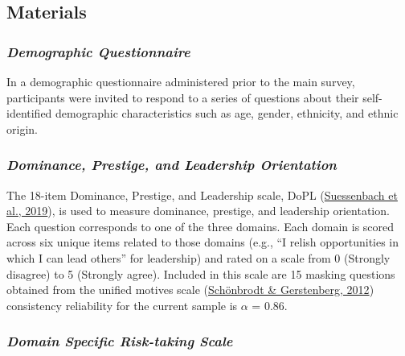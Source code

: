 \documentclass[
  donotrepeattitle,doc, 12pt, a4paper,floatsintext]{apa7}
\begin{document}
\hypertarget{materials}{%
\subsection{Materials}\label{materials}}

\newpage

\hypertarget{demographic-questionnaire}{%
\subsubsection{\texorpdfstring{\emph{Demographic Questionnaire}}{Demographic Questionnaire}}\label{demographic-questionnaire}}

In a demographic questionnaire administered prior to the main survey, participants were invited to respond to a series of questions about their self-identified demographic characteristics such as age, gender, ethnicity, and ethnic origin.

\hypertarget{dominance-prestige-and-leadership-orientation-1}{%
\subsubsection{\texorpdfstring{\emph{Dominance, Prestige, and Leadership Orientation}}{Dominance, Prestige, and Leadership Orientation}}\label{dominance-prestige-and-leadership-orientation-1}}

The 18-item Dominance, Prestige, and Leadership scale, DoPL (\protect\hyperlink{ref-suessenbach2019}{Suessenbach et al., 2019}), is used to measure dominance, prestige, and leadership orientation. Each question corresponds to one of the three domains. Each domain is scored across six unique items related to those domains (e.g., ``I relish opportunities in which I can lead others'' for leadership) and rated on a scale from 0 (Strongly disagree) to 5 (Strongly agree). Included in this scale are 15 masking questions obtained from the unified motives scale (\protect\hyperlink{ref-schonbrodt2012}{Schönbrodt \& Gerstenberg, 2012}) consistency reliability for the current sample is \(\alpha\) = 0.86.

\hypertarget{domain-specific-risk-taking-scale}{%
\subsubsection{\texorpdfstring{\emph{Domain Specific Risk-taking Scale}}{Domain Specific Risk-taking Scale}}\label{domain-specific-risk-taking-scale}}
\end{document}
